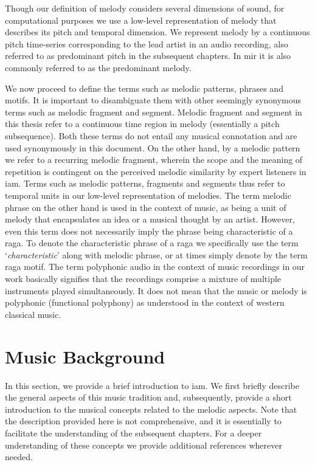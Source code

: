 Though our definition of melody considers several dimensions of sound, for computational purposes we use a low-level representation of melody that describes its pitch and temporal dimension. We represent melody by a continuous pitch time-series corresponding to the lead artist in an audio recording, also referred to as predominant pitch in the subsequent chapters. In \gls{mir} it is also commonly referred to as the predominant melody. 

We now proceed to define the terms such as melodic patterns, phrases and motifs. It is important to disambiguate them with other seemingly synonymous terms such as melodic fragment and segment. Melodic fragment and segment in this thesis refer to a continuous time region in melody (essentially a pitch subsequence). Both these terms do not entail any musical connotation and are used synonymously in this document. On the other hand, by a melodic pattern we refer to a recurring melodic fragment, wherein the scope and the meaning of repetition is contingent on the perceived melodic similarity by expert listeners in \gls{iam}. Terms such as melodic patterns, fragments and segments thus refer to temporal units in our low-level representation of melodies. The term melodic phrase on the other hand is used in the context of music, as being a unit of melody that encapsulates an idea or a musical thought by an artist. However, even this term does not necessarily imply the phrase being characteristic of a \gls{raga}. To denote the characteristic phrase of a \gls{raga} we specifically use the term `\textit{characteristic}' along with melodic phrase, or at times simply denote by the term \gls{raga} motif. The term polyphonic audio in the context of music recordings in our work basically signifies that the recordings comprise a mixture of multiple instruments played simultaneously. It does not mean that the music or melody is polyphonic (functional polyphony) as understood in the context of western classical music.

\section{Music Background}
\label{sec:music_background}

In this section, we provide a brief introduction to \gls{iam}. We first briefly describe the general aspects of this music tradition and, subsequently, provide a short introduction to the musical concepts related to the melodic aspects. Note that the description provided here is not comprehensive, and it is essentially to facilitate the understanding of the subsequent chapters. For a deeper understanding of these concepts we provide additional references wherever needed. 

